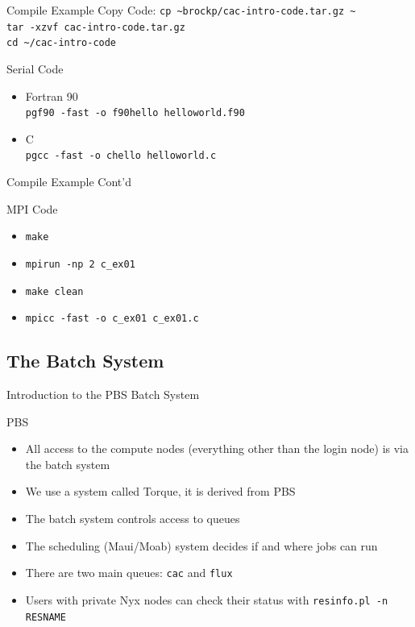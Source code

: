 \documentclass[handout]{beamer}
\begin{document}
\begin{frame}{Compile Example}
 Copy Code: \texttt{cp \~{}brockp/cac-intro-code.tar.gz \~{}} 
 \\ \texttt{tar -xzvf cac-intro-code.tar.gz}  \\ \texttt{cd \~{}/cac-intro-code}
 \begin{block}{Serial Code}
  \begin{itemize}
   \item Fortran 90
         \\ \texttt{pgf90 -fast -o f90hello helloworld.f90}
   \item C
         \\ \texttt{pgcc -fast -o chello helloworld.c}
  \end{itemize}
 \end{block}
\end{frame}
\begin{frame}{Compile Example Cont'd}
 \begin{block}{MPI Code}
  \begin{itemize}
   \item \texttt{make}
   \item \texttt{mpirun -np 2 c\_ex01}
   \item <2-> \texttt{make clean}
   \item <2-> \texttt{mpicc -fast -o c\_ex01 c\_ex01.c}
  \end{itemize}
 \end{block}
\end{frame}



  \subsection{The Batch System}
  \begin{frame}{Introduction to the PBS Batch System}
   \begin{block}{PBS}
    \begin{itemize}
    \item All access to the compute nodes (everything other than the login node)
      is via the batch system
    \item We use a system called Torque, it is derived from PBS
    \item The batch system controls access to queues
    \item The scheduling (Maui/Moab) system decides if and where jobs can run
    \item<2-> There are two main queues: \texttt{cac} and \texttt{flux}
    \item<3-> Users with private Nyx nodes can check their status with \texttt{resinfo.pl -n RESNAME}
    \end{itemize}
   \end{block}
  \end{frame}
\end{document}
